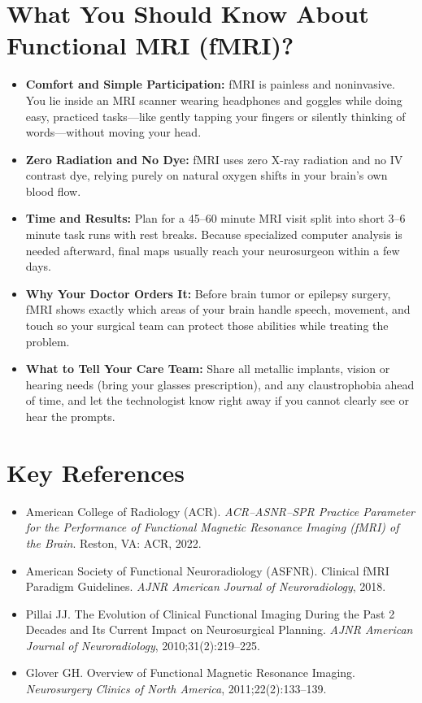 \section{What You Should Know About Functional MRI (fMRI)?}

\begin{itemize}
    \item \textbf{Comfort and Simple Participation:} fMRI is painless and noninvasive. You lie inside an MRI scanner wearing headphones and goggles while doing easy, practiced tasks---like gently tapping your fingers or silently thinking of words---without moving your head.
    \item \textbf{Zero Radiation and No Dye:} fMRI uses zero X-ray radiation and no IV contrast dye, relying purely on natural oxygen shifts in your brain's own blood flow.
    \item \textbf{Time and Results:} Plan for a 45--60 minute MRI visit split into short 3--6 minute task runs with rest breaks. Because specialized computer analysis is needed afterward, final maps usually reach your neurosurgeon within a few days.
    \item \textbf{Why Your Doctor Orders It:} Before brain tumor or epilepsy surgery, fMRI shows exactly which areas of your brain handle speech, movement, and touch so your surgical team can protect those abilities while treating the problem.
    \item \textbf{What to Tell Your Care Team:} Share all metallic implants, vision or hearing needs (bring your glasses prescription), and any claustrophobia ahead of time, and let the technologist know right away if you cannot clearly see or hear the prompts.
\end{itemize}

\section{Key References}

\begin{itemize}
    \item American College of Radiology (ACR). \textit{ACR--ASNR--SPR Practice Parameter for the Performance of Functional Magnetic Resonance Imaging (fMRI) of the Brain}. Reston, VA: ACR, 2022.
    \item American Society of Functional Neuroradiology (ASFNR). Clinical fMRI Paradigm Guidelines. \textit{AJNR American Journal of Neuroradiology}, 2018.
    \item Pillai JJ. The Evolution of Clinical Functional Imaging During the Past 2 Decades and Its Current Impact on Neurosurgical Planning. \textit{AJNR American Journal of Neuroradiology}, 2010;31(2):219--225.
    \item Glover GH. Overview of Functional Magnetic Resonance Imaging. \textit{Neurosurgery Clinics of North America}, 2011;22(2):133--139.
\end{itemize}
